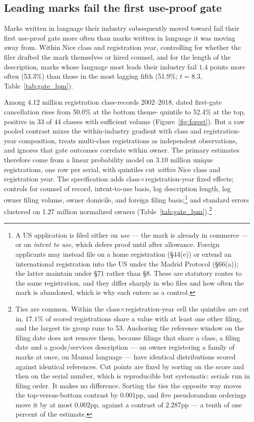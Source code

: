\subsection{Leading marks fail the first use-proof gate}\label{sec:gate}

Marks written in language their industry subsequently moved toward fail
their first use-proof gate more often than marks written in language it was
moving away from. Within Nice class and registration year, controlling for whether the
filer drafted the mark themselves or hired counsel, and for the length of the
description, marks whose language most leads their industry fail $1.4$
points more often (53.3\%) than those in the most lagging fifth (51.9\%;
$t = 8.3$, Table~\ref{tab:gate_lpm}).

Among 4.12 million registration class-records 2002--2018, dated first-gate cancellation rises from 50.0\%
at the bottom theme-\dkl{} quintile to 52.4\% at the top, positive in 33
of 44 classes with sufficient volume (Figure~\ref{fig:forest}). But a raw
pooled contrast mixes the within-industry gradient with class and registration-year
composition, treats multi-class registrations as independent observations,
and ignores that gate outcomes correlate within owner. The
primary estimates therefore come from a linear probability model on 3.10
million unique registrations, one row per serial, with \dkl{} quintiles cut
\emph{within} Nice class and registration year. The specification adds
class$\times$registration-year fixed effects; controls for counsel of record,
intent-to-use basis, log description length, log owner filing volume, owner
domicile, and foreign filing basis;\footnote{A US application is filed
either on \emph{use} --- the mark is already in commerce --- or on
\emph{intent to use}, which defers proof until after allowance. Foreign
applicants may instead file on a home registration (\S44(e)) or extend an
international registration into the US under the Madrid Protocol
(\S66(a)); the latter maintain under \S71 rather than \S8. These are
statutory routes to the same registration, and they differ sharply in who
files and how often the mark is abandoned, which is why each enters as a
control.} and standard errors clustered on 1.27
million normalized owners (Table~\ref{tab:gate_lpm}).\footnote{Ties are
common. Within the class$\times$registration-year cell the quintiles are cut in,
$17.1$\% of scored registrations share a \dkl{} value with at least one
other filing, and the largest tie group runs to 53. Anchoring the reference
window on the filing date does not remove them, because filings that share a
class, a filing date and a goods/services description --- an owner
registering a family of marks at once, on Manual language --- have identical
distributions scored against identical references. Cut points are fixed by
sorting on the score and then on the serial number, which is reproducible
but systematic: serials run in filing order. It makes no difference. Sorting
the ties the opposite way moves the top-versus-bottom contrast by $0.001$pp,
and five pseudorandom orderings move it by at most $0.002$pp, against a
contrast of $2.287$pp --- a tenth of one percent of the estimate.}


